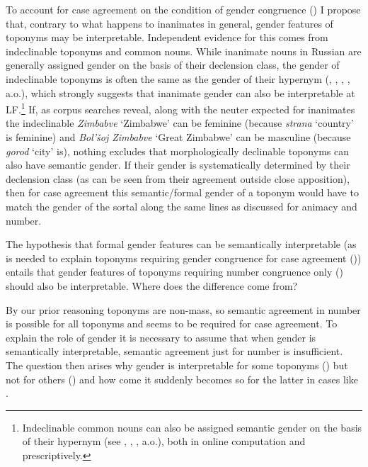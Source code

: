 \documentclass[output=paper,colorlinks,citecolor=brown]{langscibook}
\begin{document}
To account for case agreement on the condition of gender congruence () I propose that, contrary to what happens to inanimates in general, gender features of toponyms may be interpretable. Independent evidence for this comes from indeclinable toponyms and common nouns. While inanimate nouns in Russian are generally assigned gender on the basis of their declension class, the gender of indeclinable toponyms is often the same as the gender of their hypernym (\citealt{RozentalKabanova1998}, \citealt{Doleschal1996}, \citealt{Murphy2000}, \citealt{Matushansky2022}, a.o.), which strongly suggests that inanimate gender can also be interpretable at LF.\footnote{Indeclinable common nouns can also be assigned semantic gender on the basis of their hypernym (see \citealt{Wang2014}, \citealt{Baranova2016}, \citealt{ChuprinkoMagomedovaSlioussarSubmitted}, a.o.), both in online computation and prescriptively.} If, as corpus searches reveal, along with the neuter expected for inanimates the indeclinable \textit{Zimbabve} ‘Zimbabwe’ can be feminine (because \textit{strana} ‘country’ is feminine) and \textit{Bol'šoj Zimbabve} ‘Great Zimbabwe’ can be masculine (because \textit{gorod} ‘city’ is), nothing excludes that morphologically declinable toponyms can also have semantic gender. If their gender is systematically determined by their declension class (as can be seen from their agreement outside close apposition), then for case agreement this semantic/formal gender of a toponym would have to match the gender of the sortal along the same lines as discussed for animacy and number.

The hypothesis that formal gender features can be semantically interpretable (as is needed to explain toponyms requiring gender congruence for case agreement ()) entails that gender features of toponyms requiring number congruence only () should also be interpretable. Where does the difference come from?

By our prior reasoning toponyms are non-mass, so semantic agreement in number is possible for all toponyms and seems to be required for case agreement. To explain the role of gender it is necessary to assume that when gender is semantically interpretable, semantic agreement just for number is insufficient. The question then arises why gender is interpretable for some toponyms () but not for others () and how come it suddenly becomes so for the latter in cases like .
\end{document}
